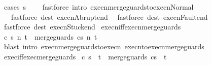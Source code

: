 \begin{isabellebody}
%
\isadelimproof
%
\endisadelimproof
%
\isatagproof
{}\isamarkupfalse%
\ {\isacharparenleft}cases\ s{\isacharparenright}\isanewline
{}\isamarkupfalse%
\ \ \ \ {\isacharparenleft}fastforce\ intro{\isacharcolon}\ execn{\isacharunderscore}merge{\isacharunderscore}guards{\isacharunderscore}to{\isacharunderscore}execn{\isacharunderscore}Normal{\isacharparenright}\isanewline
{}\isamarkupfalse%
\ \ \ {\isacharparenleft}fastforce\ dest{\isacharcolon}\ execn{\isacharunderscore}Abrupt{\isacharunderscore}end{\isacharparenright}\isanewline
{}\isamarkupfalse%
\ \ {\isacharparenleft}fastforce\ dest{\isacharcolon}\ execn{\isacharunderscore}Fault{\isacharunderscore}end{\isacharparenright}\isanewline
{}\isamarkupfalse%
\ {\isacharparenleft}fastforce\ dest{\isacharcolon}\ execn{\isacharunderscore}Stuck{\isacharunderscore}end{\isacharparenright}\isanewline
{}\isamarkupfalse%
%
\endisatagproof
{\isafoldproof}%
%
\isadelimproof
\isanewline
%
\endisadelimproof
\isanewline
{}\isamarkupfalse%
\ execn{\isacharunderscore}iff{\isacharunderscore}execn{\isacharunderscore}merge{\isacharunderscore}guards{\isacharcolon}\isanewline
\ {\isachardoublequoteopen}{\isasymGamma}{\isasymturnstile}{\isasymlangle}c{\isacharcomma}\ s{\isasymrangle}\ {\isacharequal}n{\isasymRightarrow}\ t\ {\isacharequal}\ {\isasymGamma}{\isasymturnstile}{\isasymlangle}merge{\isacharunderscore}guards\ c{\isacharcomma}s{\isasymrangle}\ {\isacharequal}n{\isasymRightarrow}\ t{\isachardoublequoteclose}\isanewline
%
\isadelimproof
\ \ %
\endisadelimproof
%
\isatagproof
{}\isamarkupfalse%
\ {\isacharparenleft}blast\ intro{\isacharcolon}\ execn{\isacharunderscore}merge{\isacharunderscore}guards{\isacharunderscore}to{\isacharunderscore}execn\ execn{\isacharunderscore}to{\isacharunderscore}execn{\isacharunderscore}merge{\isacharunderscore}guards{\isacharparenright}%
\endisatagproof
{\isafoldproof}%
%
\isadelimproof
\isanewline
%
\endisadelimproof
\isanewline
{}\isamarkupfalse%
\ exec{\isacharunderscore}iff{\isacharunderscore}exec{\isacharunderscore}merge{\isacharunderscore}guards{\isacharcolon}\isanewline
\ {\isachardoublequoteopen}{\isasymGamma}{\isasymturnstile}{\isasymlangle}c{\isacharcomma}\ s{\isasymrangle}\ {\isasymRightarrow}\ t\ {\isacharequal}\ {\isasymGamma}{\isasymturnstile}{\isasymlangle}merge{\isacharunderscore}guards\ c{\isacharcomma}s{\isasymrangle}\ {\isasymRightarrow}\ t{\isachardoublequoteclose}\isanewline
%
\isadelimproof
\ \ %
\endisadelimproof
%
\isatagproof

\end{isabellebody}
